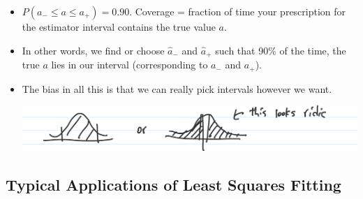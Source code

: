\begin{itemize}
    \item $P(a_{-} \leq a \leq a_{+}) = 0.90$.
          Coverage = fraction of time your prescription for the estimator interval contains the true value $a$.
    \item In other words, we find or choose $\hat{a}_{-}$ and $\hat{a}_{+}$ such that 90\% of the time, the true $a$ lies in our interval (corresponding to $a_{-}$ and $a_{+}$).
    \item The bias in all this is that we can really pick intervals however we want.

          \includegraphics[width=0.6\linewidth]{Images/lec11-biased-intervals.png}
\end{itemize}

\subsection{Typical Applications of Least Squares Fitting}

